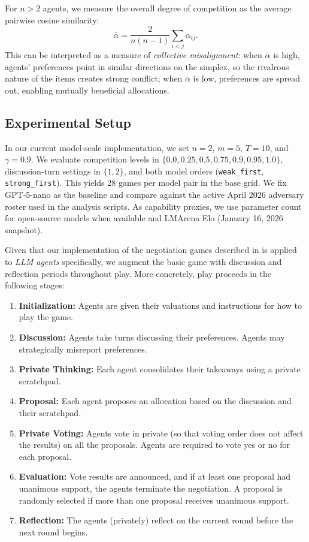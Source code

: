 For $n > 2$ agents, we measure the overall degree of competition as the average pairwise cosine similarity:
\begin{equation}
    \bar{\alpha} = \frac{2}{n(n-1)} \sum_{i < j} \alpha_{ij}.
\end{equation}
This can be interpreted as a measure of \emph{collective misalignment}: when $\bar{\alpha}$ is high, agents' preferences point in similar directions on the simplex, so the rivalrous nature of the items creates strong conflict; when $\bar{\alpha}$ is low, preferences are spread out, enabling mutually beneficial allocations.

\subsection{Experimental Setup}
\label{sec:game_1_experimental_setup}

In our current model-scale implementation, we set $n = 2$, $m = 5$, $T = 10$, and $\gamma = 0.9$.
We evaluate competition levels in $\{0.0, 0.25, 0.5, 0.75, 0.9, 0.95, 1.0\}$, discussion-turn settings in $\{1, 2\}$, and both model orders (\texttt{weak\_first}, \texttt{strong\_first}). This yields 28 games per model pair in the base grid.
We fix GPT-5-nano as the baseline and compare against the active April 2026 adversary roster used in the analysis scripts.
As capability proxies, we use parameter count for open-source models when available and LMArena Elo \citep{chiang2024chatbotarenaopenplatform} (January 16, 2026 snapshot).

Given that our implementation of the negotiation games described in  is applied to \emph{LLM agents} specifically, we augment the basic game with discussion and reflection periods throughout play.
More concretely, play proceeds in the following stages:

\begin{enumerate}
    \item \textbf{Initialization:} Agents are given their valuations and instructions for how to play the game.
    \item \textbf{Discussion:} Agents take turns discussing their preferences. Agents may strategically misreport preferences.
    \item \textbf{Private Thinking:} Each agent consolidates their takeaways using a private scratchpad.
    \item \textbf{Proposal:} Each agent proposes an allocation based on the discussion and their scratchpad.
    \item \textbf{Private Voting:} Agents vote in private (so that voting order does not affect the results) on all the proposals. Agents are required to vote yes or no for each proposal.
    \item \textbf{Evaluation:} Vote results are announced, and if at least one proposal had unanimous support, the agents terminate the negotiation. A proposal is randomly selected if more than one proposal receives unanimous support.
    \item \textbf{Reflection:} The agents (privately) reflect on the current round before the next round begins. 
\end{enumerate}

